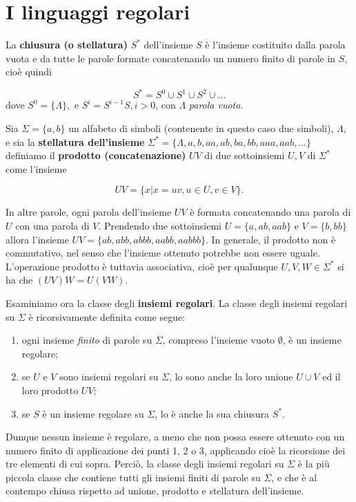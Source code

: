 \documentclass[10pt]{\classname}
\theoremstyle{definition}
\theoremstyle{definition}
\begin{document}
\section{I linguaggi regolari}

La \textbf{chiusura (o stellatura)} $S^*$ dell'insieme $S$ è l'insieme
costituito dalla parola vuota e da tutte le parole formate concatenando un
numero finito di parole in $S$, cioè quindi

$$S^* = S^0 \cup S^1 \cup S^2 \cup \dots$$
dove $S^0 = \{\Lambda\},$ e $S^i=S^{i-1}S, i > 0$, con $\Lambda$ \emph{parola vuota}.

Sia $\Sigma = \{a, b\}$ un alfabeto di simboli (contenente in questo caso due
simboli), $\Lambda$, e sia la \textbf{stellatura
dell'insieme} $\Sigma^* = \{\Lambda, a, b, aa, ab, ba, bb, aaa, aab, \dots\}$
definiamo il \textbf{prodotto (concatenazione)} $UV$ di due sottoinsiemi $U, V$
di $\Sigma^*$ come l'insieme

$$UV = \{x | x= uv, u \in U, v \in V\}.$$

In altre parole, ogni parola dell'insieme $UV$ è formata concatenando una
parola di $U$ con una parola di $V$. Prendendo due sottoinsiemi $U=\{a, ab,
aab\}$ e $V=\{b, bb\}$ allora l'insieme $UV = \{ab, abb, abbb, aabb, aabbb\}$.
In generale, il prodotto non è commutativo, nel senso che l'insieme ottenuto
potrebbe non essere uguale. L'operazione prodotto è tuttavia associativa, cioè
per qualunque $U, V, W \in \Sigma^*$ si ha che $(UV)W = U(VW)$.

Esaminiamo ora la classe degli \textbf{insiemi regolari}. La classe degli insiemi regolari su $\Sigma$ è ricorsivamente definita come segue:
\begin{enumerate}
    \item ogni insieme \emph{finito} di parole su $\Sigma$, compreso l'insieme
        vuoto $\emptyset$, è un insieme regolare;
    \item se $U$ e $V$ sono insiemi regolari su $\Sigma$, lo sono anche la loro
        unione $U\cup V$ ed il loro prodotto $UV$;
    \item se $S$ è un insieme regolare su $\Sigma$, lo è anche la sua chiusura
        $S^*$.
\end{enumerate}

Dunque nessun insieme è regolare, a meno che non possa essere ottenuto con un
numero finito di applicazione dei punti 1, 2 o 3, applicando cioè la ricorsione dei tre elementi di cui sopra. Perciò, la classe degli
insiemi regolari su $\Sigma$ è la più piccola classe che contiene tutti gli
insiemi finiti di parole su $\Sigma$, e che è al contempo chiusa rispetto ad
unione, prodotto e stellatura dell'insieme.
\end{document}
